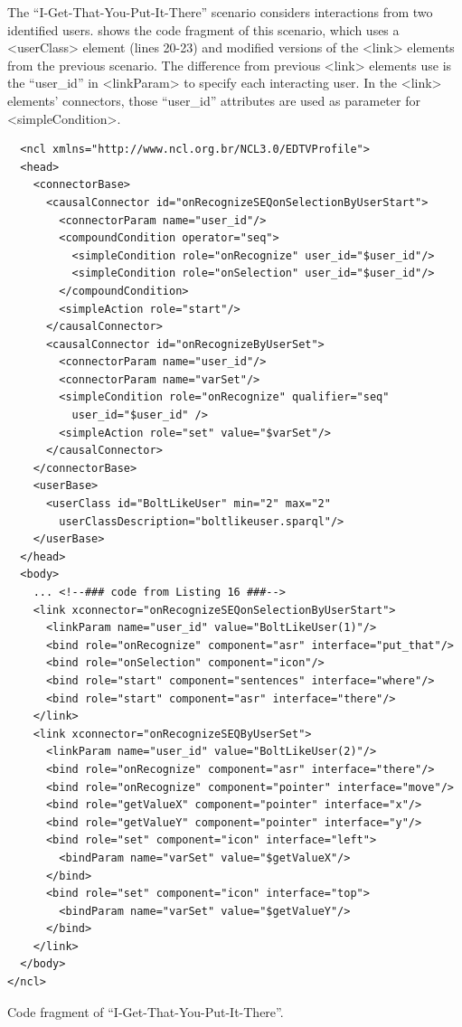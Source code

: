 \documentclass[
  doutorado,
  american
]{ThesisPUC}
\begin{document}
The “I-Get-That-You-Put-It-There” scenario considers interactions from two
identified users. \label{list:annexb6} shows the code fragment of this scenario,
which uses a <userClass> element (lines 20-23) and modified versions of the
<link> elements from the previous scenario. The difference from previous <link>
elements use is the “user\_id” in <linkParam> to specify each interacting user.
In the <link> elements’ connectors, those “user\_id” attributes are used as
parameter for <simpleCondition>.

\begin{verbatim}
  <ncl xmlns="http://www.ncl.org.br/NCL3.0/EDTVProfile">
  <head>
    <connectorBase>
      <causalConnector id="onRecognizeSEQonSelectionByUserStart">
        <connectorParam name="user_id"/>
        <compoundCondition operator="seq">
          <simpleCondition role="onRecognize" user_id="$user_id"/>
          <simpleCondition role="onSelection" user_id="$user_id"/>
        </compoundCondition>
        <simpleAction role="start"/>
      </causalConnector>
      <causalConnector id="onRecognizeByUserSet">
        <connectorParam name="user_id"/>
        <connectorParam name="varSet"/>
        <simpleCondition role="onRecognize" qualifier="seq" 
          user_id="$user_id" />
        <simpleAction role="set" value="$varSet"/>
      </causalConnector>
    </connectorBase>
    <userBase>
      <userClass id="BoltLikeUser" min="2" max="2" 
        userClassDescription="boltlikeuser.sparql"/>
    </userBase>
  </head>
  <body>
    ... <!--### code from Listing 16 ###-->
    <link xconnector="onRecognizeSEQonSelectionByUserStart">
      <linkParam name="user_id" value="BoltLikeUser(1)"/>
      <bind role="onRecognize" component="asr" interface="put_that"/>
      <bind role="onSelection" component="icon"/>
      <bind role="start" component="sentences" interface="where"/>
      <bind role="start" component="asr" interface="there"/>
    </link>
    <link xconnector="onRecognizeSEQByUserSet">
      <linkParam name="user_id" value="BoltLikeUser(2)"/>
      <bind role="onRecognize" component="asr" interface="there"/>
      <bind role="onRecognize" component="pointer" interface="move"/>
      <bind role="getValueX" component="pointer" interface="x"/>
      <bind role="getValueY" component="pointer" interface="y"/>
      <bind role="set" component="icon" interface="left">
        <bindParam name="varSet" value="$getValueX"/>
      </bind>
      <bind role="set" component="icon" interface="top">
        <bindParam name="varSet" value="$getValueY"/>
      </bind>
    </link>
  </body>
</ncl>
\end{verbatim}
\begin{listing}[!ht]
\caption{Code fragment of “I-Get-That-You-Put-It-There”.}
\label{list:annexb6}
\end{listing}
\end{document}
